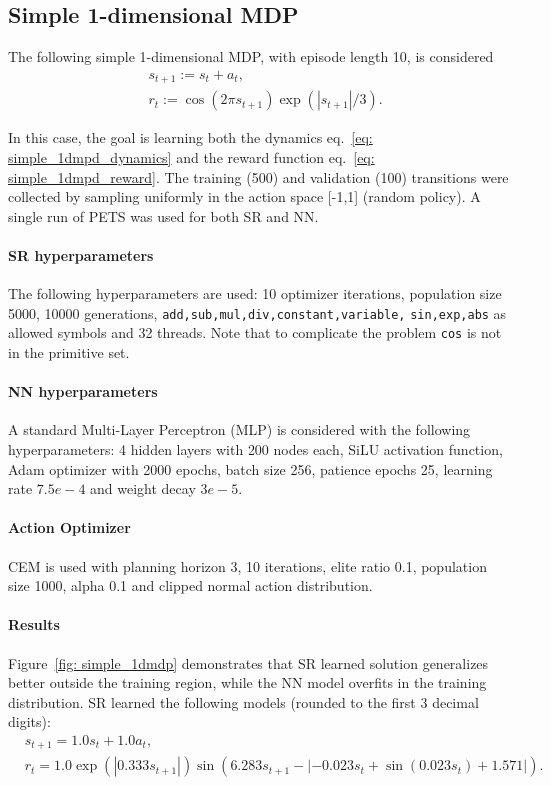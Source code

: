 \documentclass[11pt]{article}
\begin{document}
\subsection{Simple 1-dimensional MDP}
\label{sec: simple_1_dmdp}
The following simple 1-dimensional MDP, with episode length 10, is considered
\begin{align}
	&s_{t+1} := s_t + a_t, \label{eq: simple_1dmpd_dynamics}\\ 
	&r_t := \cos(2\pi s_{t+1})\exp(|s_{t+1}|/3). \label{eq: simple_1dmpd_reward}
\end{align}

In this case, the goal is learning both the dynamics eq.~\eqref{eq: simple_1dmpd_dynamics} and the reward function eq.~\eqref{eq: simple_1dmpd_reward}. The training (500) and validation (100) transitions were collected by sampling uniformly in the action space [-1,1] (random policy). A single run of PETS was used for both SR and NN.

\paragraph{SR hyperparameters} The following hyperparameters are used: 10 optimizer iterations, population size 5000, 10000 generations, \texttt{add,sub,mul,div,constant,variable,} \texttt{sin,exp,abs} as allowed symbols and 32 threads. Note that to complicate the problem \texttt{cos} is not in the primitive set.

\paragraph{NN hyperparameters} A standard Multi-Layer Perceptron (MLP) is considered with the following hyperparameters: 4 hidden layers with 200 nodes each, SiLU activation function, Adam optimizer with 2000 epochs, batch size 256, patience epochs 25, learning rate $7.5e-4$ and weight decay $3e-5$.

\paragraph{Action Optimizer} CEM is used with planning horizon 3, 10 iterations, elite ratio 0.1, population size 1000, alpha 0.1 and clipped normal action distribution.

\paragraph{Results} Figure~\ref{fig: simple_1dmdp} demonstrates that SR learned solution generalizes better outside the training region, while the NN model overfits in the training distribution. SR learned the following models (rounded to the first $3$ decimal digits):
\begin{align}
	&s_{t+1} = 1.0s_t + 1.0a_t, \label{eq: sr_simple_1dmdp_dynamics}\\
	&r_t = 1.0\exp(|0.333s_{t+1}|)\sin(6.283s_{t+1} - \left|-0.023 s_t + \sin(0.023 s_t) + 1.571\right|).\label{eq: sr_simple_1dmdp_reward}
\end{align}
\end{document}
